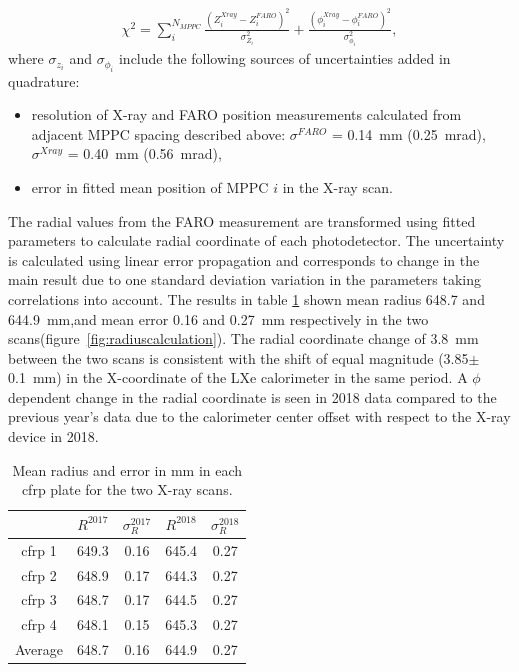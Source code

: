 \begin {align}
\chi^2 = \sum\limits_{i}^{N_{MPPC}} \frac{(Z_{i}^{Xray}-Z_{i}^{FARO})^2}{\sigma_{Z_{i}}^2} + 
         \frac{(\phi_{i}^{Xray}-\phi_{i}^{FARO})^2}{\sigma_{\phi_i}^2},
\end{align}
where $\sigma_{z_i}$ and $\sigma_{\phi_i}$ include the following sources of
uncertainties added in quadrature: 
\begin {itemize} 
\item resolution of X-ray and FARO position measurements  calculated from adjacent 
MPPC spacing described above:
$\sigma^{FARO}$ = 0.14~mm (0.25~mrad), $\sigma^{Xray}$ = 0.40~mm 
(0.56~mrad),

\item  error in fitted mean position of MPPC $i$ in the X-ray scan.
\end{itemize}

The radial values from the FARO measurement are transformed using fitted
parameters to calculate radial coordinate of each photodetector.  The
uncertainty is calculated using linear error propagation and corresponds to
change in the main result due to one standard deviation variation in the
parameters taking correlations into account.  The results in table
\ref{tab:radius} shown mean radius 648.7 and 644.9~mm,and mean error 0.16 and
0.27~mm respectively in the two scans(figure~\ref{fig:radiuscalculation}).  The
radial coordinate change of 3.8~mm between the two scans is consistent with the
shift of equal magnitude (3.85$\pm$0.1~mm) in the X-coordinate of the LXe
calorimeter in the same period.  A $\phi$ dependent change in the radial
coordinate is seen in 2018 data compared to the previous year's data due to the
calorimeter center offset with respect to the X-ray device in 2018.

\begin{table}
\begin{tabular}{ccccc}
 & $R^{2017}$ & $\sigma_R^{2017}$ & $R^{2018}$  & $\sigma_R^{2018}$  \\
\hline
cfrp 1 &  649.3 & 0.16 & 645.4 & 0.27 \\
cfrp 2 &  648.9 & 0.17 & 644.3 & 0.27 \\
cfrp 3 &  648.7 & 0.17 & 644.5 & 0.27 \\
cfrp 4 &  648.1 & 0.15 & 645.3 & 0.27 \\
Average&  648.7 & 0.16 & 644.9 & 0.27 \\
\end{tabular}
\caption{Mean radius and error in mm in each cfrp plate for the two X-ray scans.}
\label{tab:radius}
\end{table}

